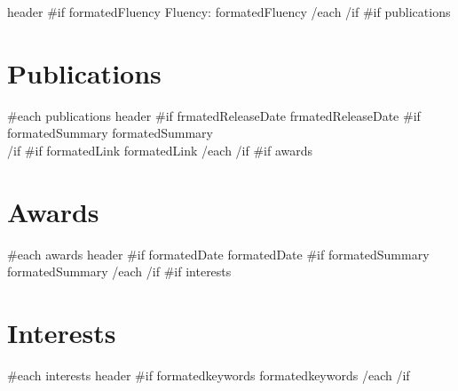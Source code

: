 \documentclass{article}
\begin{document}
\begin{paracol}{2}
\begin{leftcolumn*}
{    {{ header }}\newline
    {{#if formatedFluency}} Fluency: {{ formatedFluency }}
  {{/each}}
}{{/if}}
{{#if publications}}\section*{Publications}{
  {{#each publications}}
    {{ header }}\newline
    {{#if frmatedReleaseDate}}{{ frmatedReleaseDate }}
    {{#if formatedSummary}}
      {{ formatedSummary }}
      \\
    {{/if}}
    {{#if formatedLink}}{{ formatedLink }}
  {{/each}}
}{{/if}}
{{#if awards}}\section*{Awards}{
  {{#each awards}}
    {{ header }}\newline
    {{#if formatedDate}}{{ formatedDate }}
    {{#if formatedSummary}}{{ formatedSummary }}
  {{/each}}
}{{/if}}
{{#if interests}}\section*{Interests}{
  {{#each interests}}
    {{ header }}\newline
    {{#if formatedkeywords}}{{ formatedkeywords }} 
  {{/each}}
}{{/if}}

\end{leftcolumn*}


\end{paracol}
\end{document}

